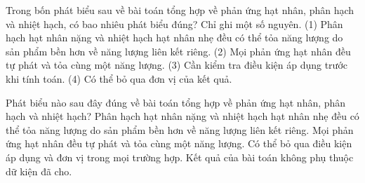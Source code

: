 \begin{ex}
Trong bốn phát biểu sau về bài toán tổng hợp về phản ứng hạt nhân, phân hạch và nhiệt hạch, có bao nhiêu phát biểu đúng? Chỉ ghi một số nguyên. (1) Phân hạch hạt nhân nặng và nhiệt hạch hạt nhân nhẹ đều có thể tỏa năng lượng do sản phẩm bền hơn về năng lượng liên kết riêng. (2) Mọi phản ứng hạt nhân đều tự phát và tỏa cùng một năng lượng. (3) Cần kiểm tra điều kiện áp dụng trước khi tính toán. (4) Có thể bỏ qua đơn vị của kết quả.
\end{ex}

\begin{ex}
Phát biểu nào sau đây đúng về bài toán tổng hợp về phản ứng hạt nhân, phân hạch và nhiệt hạch?
\choice
{\True Phân hạch hạt nhân nặng và nhiệt hạch hạt nhân nhẹ đều có thể tỏa năng lượng do sản phẩm bền hơn về năng lượng liên kết riêng.}
{Mọi phản ứng hạt nhân đều tự phát và tỏa cùng một năng lượng.}
{Có thể bỏ qua điều kiện áp dụng và đơn vị trong mọi trường hợp.}
{Kết quả của bài toán không phụ thuộc dữ kiện đã cho.}
\end{ex}

